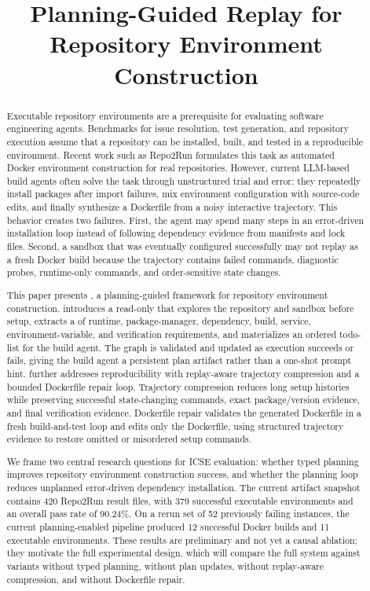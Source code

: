 \title{Planning-Guided Replay for Repository Environment Construction}

\begin{abstract}
Executable repository environments are a prerequisite for evaluating software engineering agents.
Benchmarks for issue resolution, test generation, and repository execution assume that a repository can be installed, built, and tested in a reproducible environment.
Recent work such as Repo2Run formulates this task as automated Docker environment construction for real repositories.
However, current LLM-based build agents often solve the task through unstructured trial and error: they repeatedly install packages after import failures, mix environment configuration with source-code edits, and finally synthesize a Dockerfile from a noisy interactive trajectory.
This behavior creates two failures.
First, the agent may spend many steps in an error-driven installation loop instead of following dependency evidence from manifests and lock files.
Second, a sandbox that was eventually configured successfully may not replay as a fresh Docker build because the trajectory contains failed commands, diagnostic probes, runtime-only commands, and order-sensitive state changes.

This paper presents \tool, a planning-guided framework for repository environment construction.
\tool introduces a read-only \planner that explores the repository and sandbox before setup, extracts a \ttg of runtime, package-manager, dependency, build, service, environment-variable, and verification requirements, and materializes an ordered todo-list for the build agent.
The graph is validated and updated as execution succeeds or fails, giving the build agent a persistent plan artifact rather than a one-shot prompt hint.
\tool further addresses reproducibility with replay-aware trajectory compression and a bounded Dockerfile repair loop.
Trajectory compression reduces long setup histories while preserving successful state-changing commands, exact package/version evidence, and final verification evidence.
Dockerfile repair validates the generated Dockerfile in a fresh build-and-test loop and edits only the Dockerfile, using structured trajectory evidence to restore omitted or misordered setup commands.

We frame two central research questions for ICSE evaluation: whether typed planning improves repository environment construction success, and whether the planning loop reduces unplanned error-driven dependency installation.
The current artifact snapshot contains 420 Repo2Run result files, with 379 successful executable environments and an overall pass rate of 90.24\%.
On a rerun set of 52 previously failing instances, the current planning-enabled pipeline produced 12 successful Docker builds and 11 executable environments.
These results are preliminary and not yet a causal ablation; they motivate the full experimental design, which will compare the full system against variants without typed planning, without plan updates, without replay-aware compression, and without Dockerfile repair.
\end{abstract}

